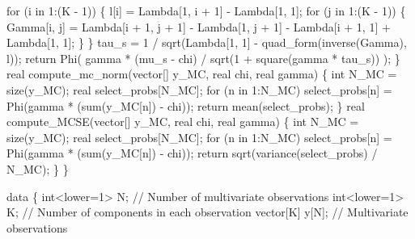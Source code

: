 \documentclass[
  letterpaper,
  DIV=11,
  numbers=noendperiod]{scrartcl}
\newenvironment{Shaded}{\begin{snugshade}}{\end{snugshade}}
\newcommand{\CommentTok}[1]{\textcolor[rgb]{0.37,0.37,0.37}{#1}}
\newcommand{\ControlFlowTok}[1]{\textcolor[rgb]{0.00,0.23,0.31}{#1}}
\newcommand{\DataTypeTok}[1]{\textcolor[rgb]{0.68,0.00,0.00}{#1}}
\newcommand{\DecValTok}[1]{\textcolor[rgb]{0.68,0.00,0.00}{#1}}
\newcommand{\KeywordTok}[1]{\textcolor[rgb]{0.00,0.23,0.31}{#1}}
\newcommand{\NormalTok}[1]{\textcolor[rgb]{0.00,0.23,0.31}{#1}}
\begin{document}
\begin{codelisting}
\begin{Shaded}
\begin{Highlighting}[]
    \ControlFlowTok{for}\NormalTok{ (i }\ControlFlowTok{in} \DecValTok{1}\NormalTok{:(K {-} }\DecValTok{1}\NormalTok{)) \{}
\NormalTok{      l[i] = Lambda[}\DecValTok{1}\NormalTok{, i + }\DecValTok{1}\NormalTok{] {-} Lambda[}\DecValTok{1}\NormalTok{, }\DecValTok{1}\NormalTok{];}
      \ControlFlowTok{for}\NormalTok{ (j }\ControlFlowTok{in} \DecValTok{1}\NormalTok{:(K {-} }\DecValTok{1}\NormalTok{)) \{}
\NormalTok{        Gamma[i, j] =  Lambda[i + }\DecValTok{1}\NormalTok{, j + }\DecValTok{1}\NormalTok{]}
\NormalTok{                     {-} Lambda[}\DecValTok{1}\NormalTok{, j + }\DecValTok{1}\NormalTok{] {-} Lambda[i + }\DecValTok{1}\NormalTok{, }\DecValTok{1}\NormalTok{]}
\NormalTok{                     + Lambda[}\DecValTok{1}\NormalTok{, }\DecValTok{1}\NormalTok{];}
\NormalTok{      \}}
\NormalTok{    \}}
\NormalTok{    tau\_s = }\DecValTok{1}\NormalTok{ / sqrt(Lambda[}\DecValTok{1}\NormalTok{, }\DecValTok{1}\NormalTok{] {-} quad\_form(inverse(Gamma), l));}
    \ControlFlowTok{return}\NormalTok{ Phi(  gamma * (mu\_s {-} chi)}
\NormalTok{               / sqrt(}\DecValTok{1}\NormalTok{ + square(gamma * tau\_s)) );}
\NormalTok{  \}}
  \DataTypeTok{real}\NormalTok{ compute\_mc\_norm(}\DataTypeTok{vector}\NormalTok{[] y\_MC, }\DataTypeTok{real}\NormalTok{ chi, }\DataTypeTok{real}\NormalTok{ gamma) \{}
    \DataTypeTok{int}\NormalTok{ N\_MC = size(y\_MC);}
    \DataTypeTok{real}\NormalTok{ select\_probs[N\_MC];}
    \ControlFlowTok{for}\NormalTok{ (n }\ControlFlowTok{in} \DecValTok{1}\NormalTok{:N\_MC) }
\NormalTok{      select\_probs[n] = Phi(gamma * (sum(y\_MC[n]) {-} chi));}
    \ControlFlowTok{return}\NormalTok{ mean(select\_probs);}
\NormalTok{  \}}
  \DataTypeTok{real}\NormalTok{ compute\_MCSE(}\DataTypeTok{vector}\NormalTok{[] y\_MC, }\DataTypeTok{real}\NormalTok{ chi, }\DataTypeTok{real}\NormalTok{ gamma) \{}
    \DataTypeTok{int}\NormalTok{ N\_MC = size(y\_MC);}
    \DataTypeTok{real}\NormalTok{ select\_probs[N\_MC];}
    \ControlFlowTok{for}\NormalTok{ (n }\ControlFlowTok{in} \DecValTok{1}\NormalTok{:N\_MC) }
\NormalTok{      select\_probs[n] = Phi(gamma * (sum(y\_MC[n]) {-} chi));}
    \ControlFlowTok{return}\NormalTok{ sqrt(variance(select\_probs) / N\_MC);}
\NormalTok{  \}}
\NormalTok{\}}

\KeywordTok{data}\NormalTok{ \{}
  \DataTypeTok{int}\NormalTok{\textless{}}\KeywordTok{lower}\NormalTok{=}\DecValTok{1}\NormalTok{\textgreater{} N; }\CommentTok{// Number of multivariate observations}
  \DataTypeTok{int}\NormalTok{\textless{}}\KeywordTok{lower}\NormalTok{=}\DecValTok{1}\NormalTok{\textgreater{} K; }\CommentTok{// Number of components in each observation}
  \DataTypeTok{vector}\NormalTok{[K] y[N]; }\CommentTok{// Multivariate observations}


\end{Highlighting}
\end{Shaded}
\end{codelisting}
\end{document}
